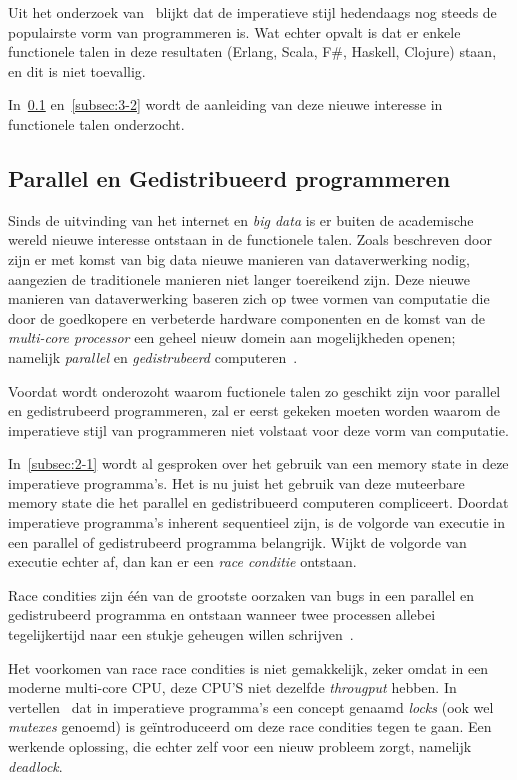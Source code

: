 \documentclass[twoside,twocolumn]{article}
\begin{document}
Uit het onderzoek van~\textcites{src7}{src8} blijkt dat de imperatieve stijl
hedendaags nog steeds de populairste vorm van programmeren is. Wat echter opvalt
is dat er enkele functionele talen in deze resultaten (Erlang, Scala, F#,
Haskell, Clojure) staan, en dit is niet toevallig.

In~\cref{subsec:3-1} en~\cref{subsec:3-2} wordt de aanleiding van deze nieuwe
interesse in functionele talen onderzocht.

\subsection{Parallel en Gedistribueerd programmeren}
\label{subsec:3-1}

Sinds de uitvinding van het internet en \textit{big data} is er buiten de
academische wereld nieuwe interesse ontstaan in de functionele talen. Zoals
beschreven door~\textcite{src10} zijn er met komst van big data nieuwe manieren
van dataverwerking nodig, aangezien de traditionele manieren niet langer
toereikend zijn. Deze nieuwe manieren van dataverwerking baseren zich op twee
vormen van computatie die door de goedkopere en verbeterde hardware componenten
en de komst van de \textit{multi-core processor} een geheel nieuw domein aan
mogelijkheden openen; namelijk \textit{parallel} en \textit{gedistrubeerd}
computeren~\cite{src10,src11}.

Voordat wordt onderozoht waarom fuctionele talen zo geschikt zijn voor parallel
en gedistrubeerd programmeren, zal er eerst gekeken moeten worden waarom de
imperatieve stijl van programmeren niet volstaat voor deze vorm van computatie.

In~\cref{subsec:2-1} wordt al gesproken over het gebruik van een memory state in
deze imperatieve programma's. Het is nu juist het gebruik van deze muteerbare
memory state die het parallel en gedistribueerd computeren compliceert. Doordat
imperatieve programma's inherent sequentieel zijn, is de volgorde van executie
in een parallel of gedistrubeerd programma belangrijk. Wijkt de volgorde van
executie echter af, dan kan er een \textit{race conditie} ontstaan.

Race condities zijn \'e\'en van de grootste oorzaken van bugs in een parallel
en gedistrubeerd programma en ontstaan wanneer twee processen allebei
tegelijkertijd naar een stukje geheugen willen schrijven~\cite{src1}.

Het voorkomen van race race condities is niet gemakkelijk, zeker omdat in een
moderne multi-core CPU, deze CPU'S niet dezelfde \textit{througput} hebben.
In~ vertellen~\citeauthor{src14} dat in imperatieve
programma's een concept genaamd \textit{locks} (ook wel \textit{mutexes}
genoemd) is ge\"introduceerd om deze race condities tegen te gaan. Een werkende
oplossing, die echter zelf voor een nieuw probleem zorgt, namelijk
\textit{deadlock}.
\end{document}
